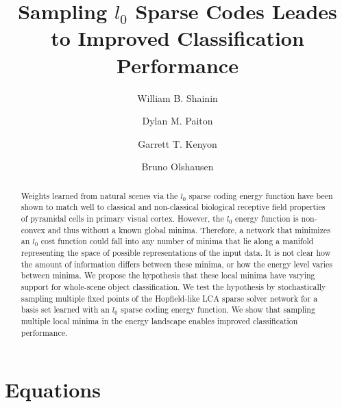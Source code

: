 \documentclass[smallextended]{svjour3}       %
\begin{document}
\title{Sampling $l_0$ Sparse Codes Leades to Improved Classification Performance
}



\author{William B. Shainin \and
        Dylan M. Paiton \and
        Garrett T. Kenyon \and
        Bruno Olshausen}





\date{}

\maketitle

\begin{abstract}
Weights learned from natural scenes via the $l_{0}$ sparse coding energy function have been shown to match well to classical and non-classical biological receptive field properties of pyramidal cells in primary visual cortex. However, the $l_{0}$ energy function is non-convex and thus without a known global minima. Therefore, a network that minimizes an $l_{0}$ cost function could fall into any number of minima that lie along a manifold representing the space of possible representations of the input data. It is not clear how the amount of information differs between these minima, or how the energy level varies between minima. We propose the hypothesis that these local minima have varying support for whole-scene object classification. We test the hypothesis by stochastically sampling multiple fixed points of the Hopfield-like LCA sparse solver network for a basis set learned with an $l_{0}$ sparse coding energy function. We show that sampling multiple local minima in the energy landscape enables improved classification performance.
\end{abstract}

\section{Equations}
\end{document}
